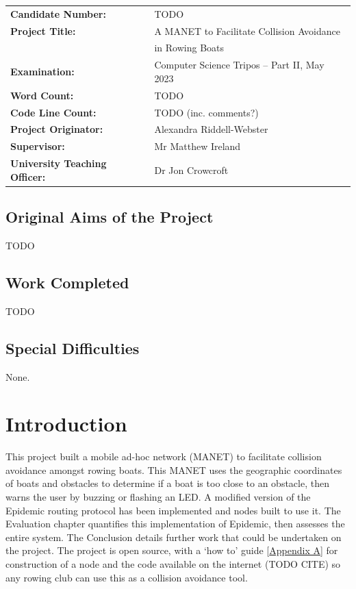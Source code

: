 \documentclass[12pt,a4paper]{report}
\newcommand{\newchapter}[2]{
    \setcounter{chapter}{#1}
    \setcounter{section}{0}
    \chapter*{#2}
    \addcontentsline{toc}{chapter}{#1 #2}
}
\begin{document}
{\large
\begin{tabular}{ll}
\bf Candidate Number:   & TODO \\
\bf Project Title:  & A MANET to Facilitate Collision Avoidance \\
& in Rowing Boats \\
\bf Examination:  & Computer Science Tripos -- Part II, May 2023      \\
\bf Word Count:    & TODO \footnotemark[1]   \\
\bf Code Line Count:    & TODO (inc. comments?) \\
\bf Project Originator: & Alexandra Riddell-Webster                 \\
\bf Supervisor:         & Mr Matthew Ireland  \\ 
\bf University Teaching Officer:  & Dr Jon Crowcroft \\ 
\end{tabular}
}


\section*{Original Aims of the Project}
TODO

\section*{Work Completed}
TODO

\section*{Special Difficulties}
None.


\newpage
{
\hypersetup{linkcolor=black}
\tableofcontents
}

\newchapter{1}{Introduction}
This project built a mobile ad-hoc network (MANET) to facilitate collision avoidance amongst rowing boats. This MANET uses the geographic coordinates of boats and obstacles to determine if a boat is too close to an obstacle, then warns the user by buzzing or flashing an LED. A modified version of the Epidemic routing protocol has been implemented and nodes built to use it. The Evaluation chapter quantifies this implementation of Epidemic, then assesses the entire system. The Conclusion details further work that could be undertaken on the project. The project is open source, with a `how to' guide [\hyperref[appendixA]{Appendix A}] for construction of a node and the code available on the internet (TODO CITE) so any rowing club can use this as a collision avoidance tool.    
\end{document}

